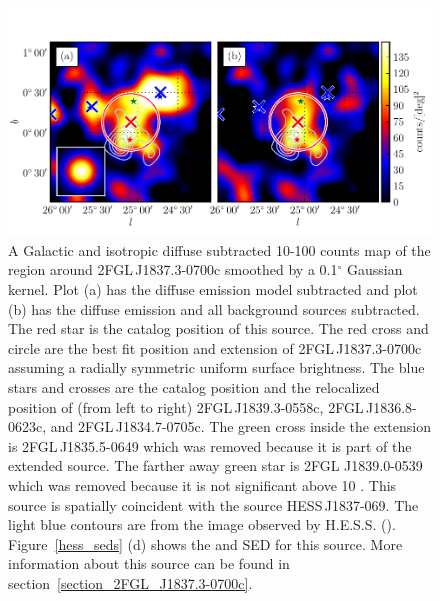 \documentclass[12pt,preprint]{aastex}
\newcommand{\gev}{\text{GeV}\xspace}
\newcommand{\tev}{\text{TeV}\xspace}
\renewcommand{\deg}{\ensuremath{^\circ}\xspace}
\begin{document}
\begin{figure}
  \begin{center}
    \includegraphics[type=pdf,ext=.pdf,read=.pdf]{source_plots/source_1FGL_J1837.5-0659c}
  \end{center}
  \caption{
  A Galactic and isotropic diffuse subtracted 10-100 \gev counts map of
  the region around 2FGL\,J1837.3-0700c smoothed by a 0.1\deg Gaussian
  kernel.  Plot (a) has the diffuse emission model subtracted and plot (b)
  has the diffuse emission and all background sources subtracted.  The red
  star is the catalog position of this source. The red cross and circle
  are the best fit position and extension  of 2FGL\,J1837.3-0700c 
  assuming a radially
  symmetric uniform surface brightness. The blue stars and crosses are the
  catalog position and the relocalized position of (from left to right)
  2FGL\,J1839.3-0558c, 2FGL\,J1836.8-0623c, and 2FGL\,J1834.7-0705c.
  The green cross inside the extension is 2FGL\,J1835.5-0649 which
  was removed because it is part of the extended source.  The farther
  away green star is 2FGL J1839.0-0539 which was removed because
  it is not significant above 10 \gev.  This source is spatially
  coincident with the \tev source HESS\,J1837-069.  The light blue contours are from the \tev image observed by H.E.S.S.
  (\cite{hess_plane_survey}).  Figure~\ref{hess_seds} (d) shows the \gev
  and \tev SED for this source.  More information about this source can
  be found in section~\ref{section_2FGL_J1837.3-0700c}.
  }\label{1FGL_J1837.5-0659c}
\end{figure}
\end{document}
